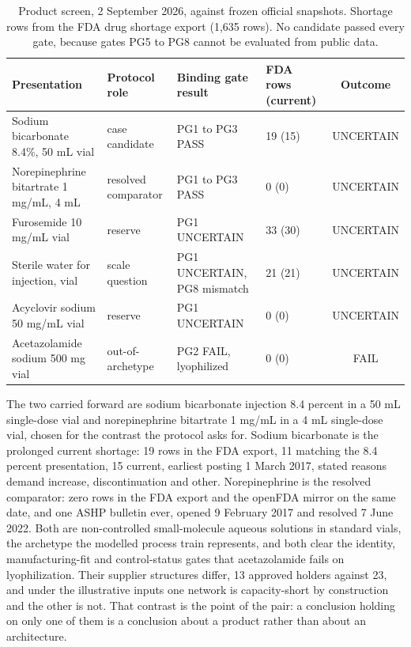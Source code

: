 \begin{table}[htbp]
\centering
\caption{Product screen, 2 September 2026, against frozen official snapshots. Shortage rows
from the FDA drug shortage export (1,635 rows). No candidate passed every gate, because gates
PG5 to PG8 cannot be evaluated from public data.}
\label{tab:screen}
\footnotesize
\setlength{\tabcolsep}{4pt}
\begin{tabular}{@{}llllc@{}}
\toprule
Presentation & Protocol role & Binding gate result & FDA rows (current) & Outcome \\
\midrule
Sodium bicarbonate 8.4\%, 50 mL vial & case candidate & PG1 to PG3 PASS & 19 (15) & UNCERTAIN \\
Norepinephrine bitartrate 1 mg/mL, 4 mL & resolved comparator & PG1 to PG3 PASS & 0 (0) & UNCERTAIN \\
Furosemide 10 mg/mL vial & reserve & PG1 UNCERTAIN & 33 (30) & UNCERTAIN \\
Sterile water for injection, vial & scale question & PG1 UNCERTAIN, PG8 mismatch & 21 (21) & UNCERTAIN \\
Acyclovir sodium 50 mg/mL vial & reserve & PG1 UNCERTAIN & 0 (0) & UNCERTAIN \\
Acetazolamide sodium 500 mg vial & out-of-archetype & PG2 FAIL, lyophilized & 0 (0) & FAIL \\
\bottomrule
\end{tabular}
\end{table}

The two carried forward are sodium bicarbonate injection 8.4 percent in a 50 mL single-dose
vial and norepinephrine bitartrate 1 mg/mL in a 4 mL single-dose vial, chosen for the contrast
the protocol asks for. Sodium bicarbonate is the prolonged current shortage: 19 rows in the FDA
export, 11 matching the 8.4 percent presentation, 15 current, earliest posting 1 March 2017,
stated reasons demand increase, discontinuation and other. Norepinephrine is the resolved
comparator: zero rows in the FDA export and the openFDA mirror on the same date, and one ASHP
bulletin ever, opened 9 February 2017 and resolved 7 June 2022. Both are non-controlled
small-molecule aqueous solutions in standard vials, the archetype the modelled process train
represents, and both clear the identity, manufacturing-fit and control-status gates that
acetazolamide fails on lyophilization. Their supplier structures differ, 13 approved holders
against 23, and under the illustrative inputs one network is capacity-short by construction and
the other is not. That contrast is the point of the pair: a conclusion holding on only one of
them is a conclusion about a product rather than about an architecture.

